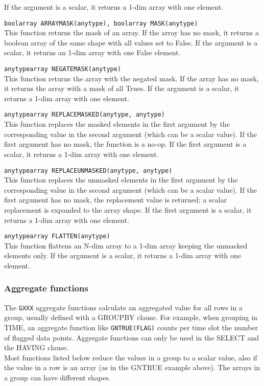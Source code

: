 \begin{description}
    If the argument is a scalar, it returns a 1-dim array with one element.
  \item[] \texttt{boolarray ARRAYMASK(anytype), boolarray MASK(anytype)}\\
    This function returns the mask of an array. If the array has no
    mask, it returns a boolean array of the same shape with all values
    set to False.
    If the argument is a scalar, it returns an 1-dim array with one False
    element.
 \item[] \texttt{anytypearray NEGATEMASK(anytype)}\\
    This function returns the array with the negated mask. If the array has
    no mask, it returns the array with a mask of all Trues.
    If the argument is a scalar, it returns a 1-dim array with one element.
 \item[] \texttt{anytypearray REPLACEMASKED(anytype, anytype)}\\
    This function replaces the masked elements in the first argument
    by the corresponding value in the second argument (which can be a
    scalar value).
    If the first argument has no mask, the function is a no-op.
    If the first argument is a scalar, it returns a 1-dim array with one element.
 \item[] \texttt{anytypearray REPLACEUNMASKED(anytype, anytype)}\\
    This function replaces the unmasked elements in the first argument
    by the corresponding value in the second argument (which can be a
    scalar value).
    If the first argument has no mask, the replacement value is
    returned; a scalar replacement is expanded to the array shape.
    If the first argument is a scalar, it returns a 1-dim array with one element.
  \item[] \texttt{anytypearray FLATTEN(anytype)}\\
    This function flattens an N-dim array to a 1-dim array keeping the
    unmasked elements only.
    If the argument is a scalar, it returns a 1-dim array with one element.
\end{description}

\subsubsection{\label{TAQL:AGGRFUNC}Aggregate functions}
The \texttt{GXXX} aggregate functions calculate an aggregated value
for all rows in a group, usually defined with a GROUPBY clause.
For example, when grouping in TIME, an aggregate function like
\texttt{GNTRUE(FLAG)} counts per time slot the number of flagged data
points. 
Aggregate functions can only be used in the SELECT and the HAVING clause. 
\\Most functions listed below reduce the values in a group to a scalar
value, also if the value in a row is an array (as in the GNTRUE
example above). The arrays in a group can have different shapes.

